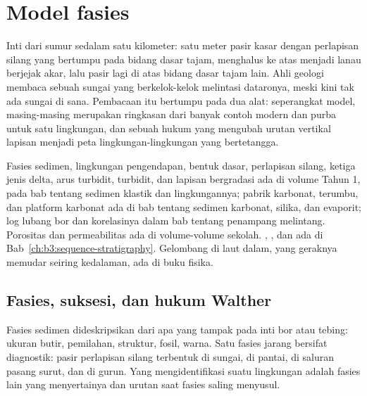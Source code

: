 \chapter{Model fasies}\label{ch:b3:facies-models}

Inti dari sumur sedalam satu kilometer: satu meter pasir kasar dengan
perlapisan silang yang bertumpu pada bidang dasar tajam, menghalus ke atas menjadi lanau
berjejak akar, lalu pasir lagi di atas bidang dasar tajam lain. Ahli geologi membaca
sebuah sungai yang berkelok-kelok melintasi dataronya, meski kini tak ada sungai di sana. Pembacaan itu
bertumpu pada dua alat: seperangkat model, masing-masing merupakan ringkasan dari banyak
contoh modern dan purba untuk satu lingkungan, dan sebuah hukum yang mengubah urutan vertikal
lapisan menjadi peta lingkungan-lingkungan yang bertetangga.

\begin{recall}
Fasies sedimen, lingkungan pengendapan, bentuk dasar, perlapisan silang,
ketiga jenis delta, arus turbidit, turbidit, dan lapisan bergradasi ada di
volume Tahun 1, pada bab tentang sedimen klastik dan
lingkungannya; pabrik karbonat, terumbu, dan platform karbonat ada di
bab tentang sedimen karbonat, silika, dan evaporit; log lubang bor dan
korelasinya dalam bab tentang penampang melintang. Porositas dan
permeabilitas ada di volume-volume sekolah. , , dan
 ada di Bab~\ref{ch:b3:sequence-stratigraphy}. Gelombang di
laut dalam, yang geraknya memudar seiring kedalaman, ada di buku fisika.
\end{recall}

\section{Fasies, suksesi, dan hukum Walther}\label{sec:b3:facies-models:walther}

Fasies sedimen dideskripsikan dari apa yang tampak pada inti bor atau
tebing: ukuran butir, pemilahan, struktur, fosil, warna. Satu fasies
jarang bersifat diagnostik: pasir perlapisan silang terbentuk di sungai, di pantai, di
saluran pasang surut, dan di gurun. Yang mengidentifikasi suatu lingkungan
adalah fasies lain yang menyertainya dan urutan saat fasies saling menyusul.

